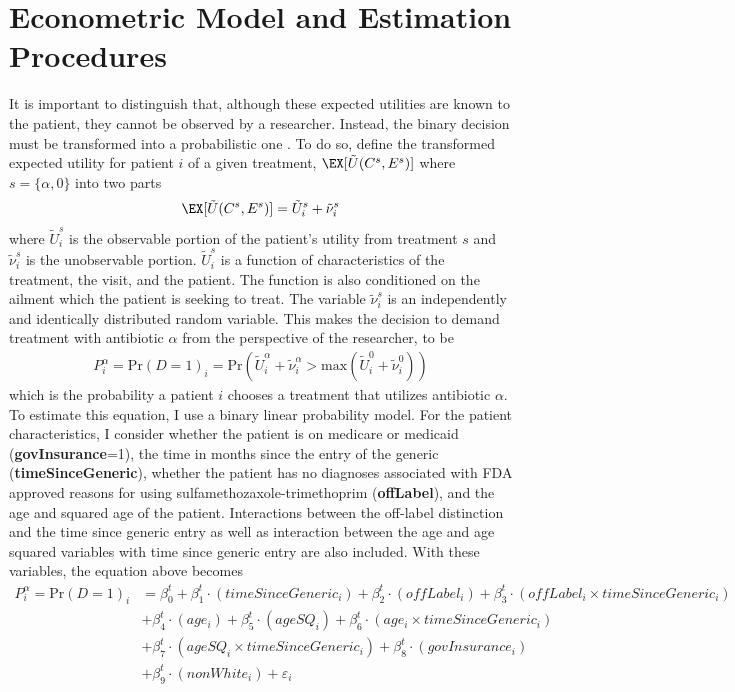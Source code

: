 \section{Econometric Model and Estimation Procedures}
\indent It is important to distinguish that, although these expected utilities are known to the patient, they cannot be observed by a researcher. Instead, the binary decision must be transformed into a probabilistic one \cite{train_discrete_nodate, templeton_household_2008}. To do so, define the transformed expected utility for patient $i$ of a given treatment, $\EX[\tilde{U}(C^s,E^s)]$ where $s = \{\alpha,0\}$ into two parts
\begin{eqnarray}
\EX[\tilde{U}(C^s,E^s)] = \tilde{U}_i^s + \tilde{\nu}_i^s
\end{eqnarray}
where $\tilde{U}_i^s$ is the observable portion of the patient's utility from treatment $s$ and $\tilde{\nu}_i^s$ is the unobservable portion. $\tilde{U}_i^s$ is a function of characteristics of the treatment, the visit, and the patient. The function is also conditioned on the ailment which the patient is seeking to treat. The variable $\tilde{\nu}_i^s$ is an independently and identically distributed random variable. This makes the decision to demand treatment with antibiotic $\alpha$ from the perspective of the researcher, to be
\begin{eqnarray}
P_i^\alpha =\text{Pr}(D = 1)_i = \text{Pr}(\tilde{U}^\alpha_i + \tilde{\nu}^\alpha_i > \text{max}(\tilde{U}^0_i + \tilde{\nu}^0_i))
\end{eqnarray}
which is the probability a patient $i$ chooses a treatment that utilizes antibiotic $\alpha$.\\
\indent To estimate this equation, I use a binary linear probability model. For the patient characteristics, I consider whether the patient is on medicare or medicaid (\textbf{govInsurance}=1), the time in months since the entry of the generic (\textbf{timeSinceGeneric}), whether the patient has no diagnoses associated with FDA approved reasons for using sulfamethozaxole-trimethoprim (\textbf{offLabel}), and the age and squared age of the patient. Interactions between the off-label distinction and the time since generic entry as well as interaction between the age and age squared variables with time since generic entry are also included. With these variables, the equation above becomes
\begin{equation}
\begin{split}
    P_i^\alpha =\text{Pr}(D = 1)_i & = \beta^t_0 + \beta^t_1\cdot(timeSinceGeneric_i) + \beta_2^t\cdot(offLabel_i) + \beta_3^t\cdot(offLabel_i\times timeSinceGeneric_i)\\
    & + \beta_4^t\cdot(age_i) + \beta_5^t\cdot(ageSQ_i)  + \beta_6^t\cdot(age_i\times timeSinceGeneric_i)\\
    & + \beta_7^t\cdot(ageSQ_i\times timeSinceGeneric_i)  + \beta_8^t\cdot(govInsurance_i)\\
    & + \beta_9^t\cdot(nonWhite_i) + \varepsilon_i
\end{split}
\end{equation}
